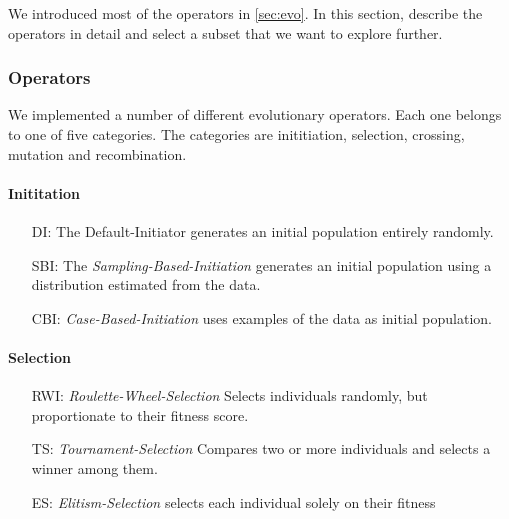 \documentclass[./../../paper.tex]{subfiles}
\begin{document}



We introduced most of the operators in \autoref{sec:evo}. In this section, describe the operators in detail and select a subset that we want to explore further.

\subsubsection{Operators}
We implemented a number of different evolutionary operators. Each one belongs to one of five categories. The categories are inititiation, selection, crossing, mutation and recombination.  

\paragraph{Inititation}
\begin{enumerate}
    \item[DI:] The Default-Initiator generates an initial population entirely randomly. 
    \item[SBI:] The \emph{Sampling-Based-Initiation} generates an initial population using a distribution estimated from the data. 
    \item[CBI:] \emph{Case-Based-Initiation} uses examples of the data as initial population. 
\end{enumerate}

\paragraph{Selection}
\begin{enumerate}
    \item[RWI:] \emph{Roulette-Wheel-Selection} Selects individuals randomly, but proportionate to their fitness score. 
    \item[TS:] \emph{Tournament-Selection} Compares two or more individuals and selects a winner among them. 
    \item[ES:] \emph{Elitism-Selection} selects each individual solely on their fitness 
\end{enumerate}
\end{document}
